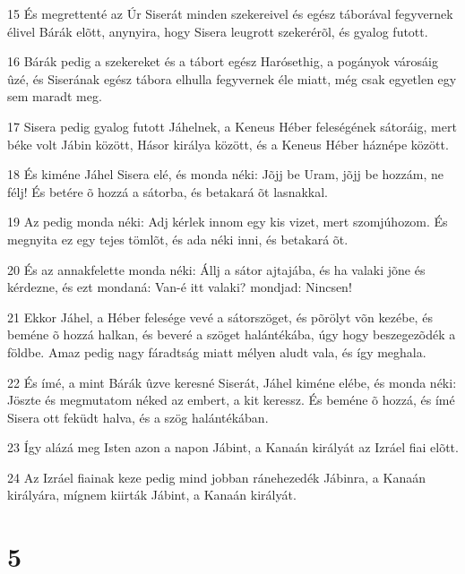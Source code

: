 \par 15 És megrettenté az Úr Siserát minden szekereivel és egész táborával fegyvernek élivel Bárák elõtt, anynyira, hogy Sisera leugrott szekerérõl, és gyalog futott.
\par 16 Bárák pedig a szekereket és a tábort egész Harósethig, a pogányok városáig ûzé, és Siserának egész tábora elhulla fegyvernek éle miatt, még csak egyetlen egy sem maradt meg.
\par 17 Sisera pedig gyalog futott Jáhelnek, a Keneus Héber feleségének sátoráig, mert béke volt Jábin között, Hásor királya között, és a Keneus Héber háznépe között.
\par 18 És kiméne Jáhel Sisera elé, és monda néki: Jõjj be Uram, jõjj be hozzám, ne félj! És betére õ hozzá a sátorba, és betakará õt lasnakkal.
\par 19 Az pedig monda néki: Adj kérlek innom egy kis vizet, mert szomjúhozom. És megnyita ez egy tejes tömlõt, és ada néki inni, és betakará õt.
\par 20 És az annakfelette monda néki: Állj a sátor ajtajába, és ha valaki jõne és kérdezne, és ezt mondaná: Van-é itt valaki? mondjad: Nincsen!
\par 21 Ekkor Jáhel, a Héber felesége vevé a sátorszöget, és põrölyt võn kezébe, és beméne õ hozzá halkan, és beveré a szöget halántékába, úgy hogy beszegezõdék a földbe. Amaz pedig nagy fáradtság miatt mélyen aludt vala, és így meghala.
\par 22 És ímé, a mint Bárák ûzve keresné Siserát, Jáhel kiméne elébe, és monda néki: Jöszte és megmutatom néked az embert, a kit keressz. És beméne õ hozzá, és ímé Sisera ott feküdt halva, és a szög halántékában.
\par 23 Így alázá meg Isten azon a napon Jábint, a Kanaán királyát az Izráel fiai elõtt.
\par 24 Az Izráel fiainak keze pedig mind jobban ránehezedék Jábinra, a Kanaán királyára, mígnem kiirták Jábint, a Kanaán királyát.

\chapter{5}

